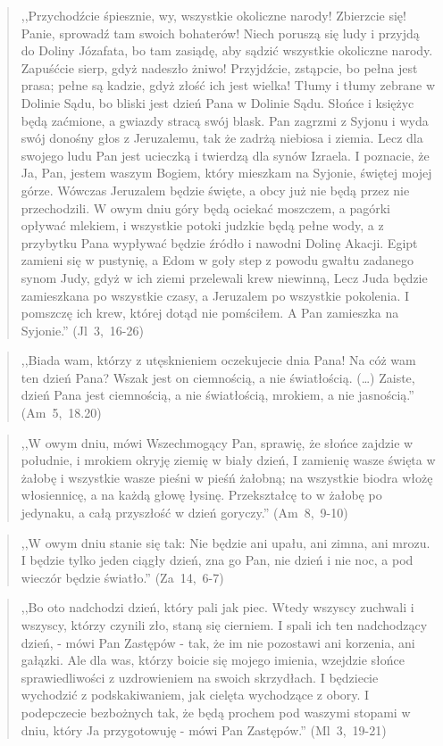 \documentclass[10pt,a4paper,oneside]{article}
\begin{document}
\begin{quote}
,,Przychodźcie śpiesznie, wy, wszystkie okoliczne narody! Zbierzcie się! Panie, sprowadź tam swoich bohaterów! Niech poruszą się ludy i przyjdą do Doliny Józafata, bo tam zasiądę, aby sądzić wszystkie okoliczne narody. Zapuśćcie sierp, gdyż nadeszło żniwo! Przyjdźcie, zstąpcie, bo pełna jest prasa; pełne są kadzie, gdyż złość ich jest wielka! Tłumy i tłumy zebrane w Dolinie Sądu, bo bliski jest dzień Pana w Dolinie Sądu. Słońce i księżyc będą zaćmione, a gwiazdy stracą swój blask. Pan zagrzmi z Syjonu i wyda swój donośny głos z Jeruzalemu, tak że zadrżą niebiosa i ziemia. Lecz dla swojego ludu Pan jest ucieczką i twierdzą dla synów Izraela. I poznacie, że Ja, Pan, jestem waszym Bogiem, który mieszkam na Syjonie, świętej mojej górze. Wówczas Jeruzalem będzie święte, a obcy już nie będą przez nie przechodzili. W owym dniu góry będą ociekać moszczem, a pagórki opływać mlekiem, i wszystkie potoki judzkie będą pełne wody, a z przybytku Pana wypływać będzie źródło i nawodni Dolinę Akacji. Egipt zamieni się w pustynię, a Edom w goły step z powodu gwałtu zadanego synom Judy, gdyż w ich ziemi przelewali krew niewinną, Lecz Juda będzie zamieszkana po wszystkie czasy, a Jeruzalem po wszystkie pokolenia. I pomszczę ich krew, której dotąd nie pomściłem. A Pan zamieszka na Syjonie.'' \mbox{(Jl 3, 16-26)}
\end{quote}
\begin{quote}
,,Biada wam, którzy z utęsknieniem oczekujecie dnia Pana! Na cóż wam ten dzień Pana? Wszak jest on ciemnością, a nie światłością. (\ldots) Zaiste, dzień Pana jest ciemnością, a nie światłością, mrokiem, a nie jasnością.'' \mbox{(Am 5, 18.20)}
\end{quote}
\begin{quote}
,,W owym dniu, mówi Wszechmogący Pan, sprawię, że słońce zajdzie w południe, i mrokiem okryję ziemię w biały dzień, I zamienię wasze święta w żałobę i wszystkie wasze pieśni w pieśń żałobną; na wszystkie biodra włożę włosiennicę, a na każdą głowę łysinę. Przekształcę to w żałobę po jedynaku, a całą przyszłość w dzień goryczy.'' \mbox{(Am 8, 9-10)}
\end{quote}
\begin{quote}
,,W owym dniu stanie się tak: Nie będzie ani upału, ani zimna, ani mrozu. I będzie tylko jeden ciągły dzień, zna go Pan, nie dzień i nie noc, a pod wieczór będzie światło.'' \mbox{(Za 14, 6-7)}
\end{quote}
\begin{quote}
,,Bo oto nadchodzi dzień, który pali jak piec. Wtedy wszyscy zuchwali i wszyscy, którzy czynili zło, staną się cierniem. I spali ich ten nadchodzący dzień, - mówi Pan Zastępów - tak, że im nie pozostawi ani korzenia, ani gałązki. Ale dla was, którzy boicie się mojego imienia, wzejdzie słońce sprawiedliwości z uzdrowieniem na swoich skrzydłach. I będziecie wychodzić z podskakiwaniem, jak cielęta wychodzące z obory. I podepczecie bezbożnych tak, że będą prochem pod waszymi stopami w dniu, który Ja przygotowuję - mówi Pan Zastępów.'' \mbox{(Ml 3, 19-21)}
\end{quote}
\end{document}
